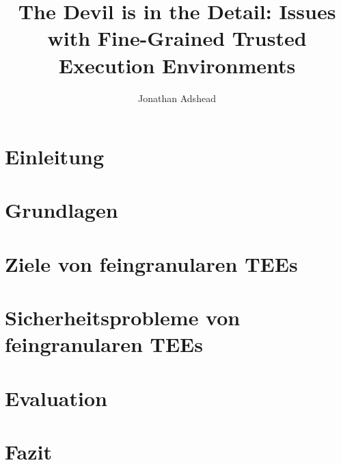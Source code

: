 \documentclass[sigconf]{acmart}
\title{The Devil is in the Detail: Issues with Fine-Grained Trusted Execution Environments}
\author{Jonathan Adshead}
\affiliation{
    \institution{Friedricht-Alexander-Universität Erlangen-Nürnberg}
    \country{}}
\begin{document}
\maketitle  %







\section{Einleitung}


\section{Grundlagen}


\section{Ziele von feingranularen TEEs}


\section{Sicherheitsprobleme von feingranularen TEEs}


\section{Evaluation}


\section{Fazit}


\newpage


\end{document}
